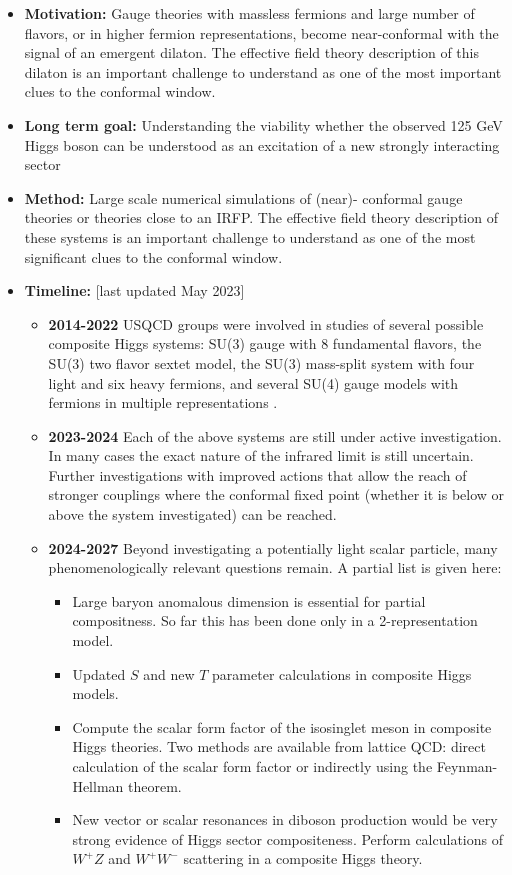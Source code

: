 \documentclass[12pt,hyperpdf]{article}
\begin{document}


\begin{itemize}
\item{ \bf Motivation:} Gauge theories with massless fermions and large
  number of flavors, or in higher fermion representations, become
  near-conformal with the signal of an emergent dilaton. The effective
  field theory description of this dilaton is an important challenge
  to understand as one of the most important clues to the conformal
  window. 
  \item { \bf Long term goal:} Understanding the viability whether the
     observed 125 GeV Higgs boson can be understood as an excitation of
     a new strongly interacting sector
\item {\bf Method:} Large scale numerical simulations of (near)-
     conformal gauge theories or theories close to an IRFP.  
     The effective field theory description of these systems 
     is an important challenge to understand as one of the most
    significant clues to the conformal window. 
\item{\bf Timeline:} \hfill [last updated May 2023]
\begin{itemize}
   \item{\bf 2014-2022} USQCD groups were involved in studies of several possible composite Higgs systems: SU(3) gauge with 8 fundamental flavors, the SU(3) two flavor sextet model, the SU(3)  mass-split system with four light and six heavy fermions, and several SU(4) gauge models with fermions in multiple representations \cite{Fodor:2020niv,LatticeStrongDynamics:2020uwo,Hasenfratz:2023sqa,LSD:2023uzj}. 
   \item{\bf 2023-2024} Each of the above systems are still under active investigation. In many cases the exact nature of the infrared limit is still uncertain. Further investigations with improved actions that allow the reach of stronger couplings where the conformal fixed point (whether it is below or above the system investigated) can be reached.
   \item{\bf 2024-2027} Beyond investigating a potentially light scalar particle, many phenomenologically relevant questions remain. A partial list is given here:
   \begin{itemize}
       \item Large baryon anomalous dimension is essential for partial compositness. So far this has been done  only in a 2-representation model. \cite{Hasenfratz:2023sqa}
       \item Updated $S$ and new $T$ parameter calculations in composite Higgs models.
       \item Compute the scalar form factor of the isosinglet meson in composite Higgs theories. Two methods are available from lattice QCD: direct calculation of the scalar form factor or indirectly using the Feynman-Hellman theorem.
       \item New vector or scalar resonances in diboson production would be very strong evidence of Higgs sector compositeness. Perform calculations of $W^+ Z$ and $W^+ W^-$ scattering in a composite Higgs theory.
   \end{itemize}
\end{itemize}
\end{itemize}
\end{document}
